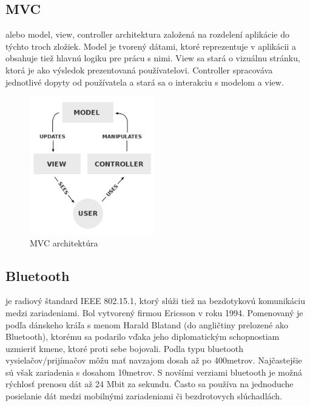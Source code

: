 \subsection{MVC} alebo model, view, controller architektura založená na rozdelení aplikácie do týchto troch zložiek. Model je tvorený dátami, ktoré reprezentuje v aplikácii a obsahuje tiež hlavnú logiku pre prácu s nimi. View sa stará o vizuálnu stránku, ktorá je ako výsledok prezentovaná používatelovi. Controller spracováva jednotlivé dopyty od používatela a stará sa o interakciu s modelom a view.
\begin{figure}[h]
  \centering
  \includegraphics[height=6cm]{mainmatter/imgs/mvc.png}
  \caption{MVC architektúra}
  \label{fig:comenius}
\end{figure}



\subsection{Bluetooth} je radiový štandard IEEE 802.15.1, ktorý slúži tiež na bezdotykovú komunikáciu medzi zariadeniami. Bol vytvorený firmou Ericsson v roku 1994. Pomenovaný je podľa dánskeho kráľa s menom Harald Blatand (do angličtiny prelozené ako Bluetooth), ktorému sa podarilo vďaka jeho diplomatickým schopnostiam uzmieriť kmene, ktoré proti sebe bojovali. Podla typu bluetooth vysielačov/prijímačov môžu mať navzajom dosah až po 400metrov. Najčastejšie sú však zariadenia s dosahom 10metrov. S novšími verziami bluetooth je možná rýchlosť prenosu dát až 24 Mbit za sekundu. Často sa používa na jednoduche posielanie dát medzi mobilnými zariadeniami či bezdrotovych slúchadlách. 



